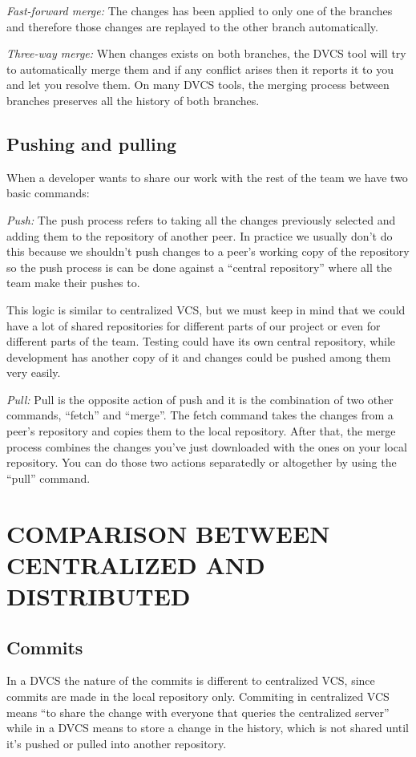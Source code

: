 \documentclass[a4paper,10pt]{article}
\begin{document}
\emph{Fast-forward merge:} The changes has been applied to only one of the branches and therefore those changes are replayed to the other branch automatically.

\emph{Three-way merge:} When changes exists on both branches, the DVCS tool will try to automatically merge them and if any conflict arises then it reports it to you and let you resolve them. 
On many DVCS tools, the merging process\cite{svnmerging} between branches preserves all the history of 
both branches.

\subsection{Pushing and pulling}
When a developer wants to share our work with the rest of the team we have two basic commands:

\emph{Push:}
The push process refers to taking all the changes previously selected and adding them to the repository of another peer. In practice we usually don't do this because we shouldn't push changes to a peer's working copy of the repository so the push process is can be done against a ``central repository'' where all the team make their pushes to.

This logic is similar to centralized VCS, but we must keep in mind that we could have a lot of shared repositories for different parts of our project or even for different parts of the team. Testing could have its own central repository, while development has another copy of it and changes could be pushed among them very easily.

\emph{Pull:} 
Pull is the opposite action of push and it is the combination of two other commands, ``fetch'' and ``merge''. The fetch command takes the changes from a peer's repository and copies them to the local repository. After that, the merge process combines the changes you've just downloaded with the ones on your local repository. You can do those two actions separatedly or altogether by using the ``pull'' command.

\section{COMPARISON BETWEEN CENTRALIZED AND DISTRIBUTED}
\label{CENTRALIZED DISTRIBUTED COMPARISON}

\subsection{Commits}
\label{Commits}
In a DVCS the nature of the commits is different to centralized VCS, since commits are made in the local repository only. 
Commiting in centralized VCS means ``to share the change with everyone that queries the centralized server'' while in a 
DVCS means to store a change in the history, which is not shared until it's pushed or pulled into another repository.
\end{document}
